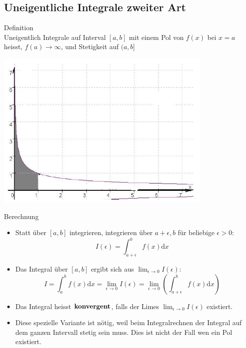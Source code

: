 \subsection{Uneigentliche Integrale zweiter Art}
	\begin{definition}{Definition}\\
		Uneigentlich Integrale auf Interval \([a,b]\) mit einem Pol von \(f(x)\) bei \(x=a\) heisst,
		\(f(a) \rightarrow \infty\), und Stetigkeit auf \((a,b]\)
	  \begin{centering}
	  \includegraphics[width=0.8\textwidth]{images/Uneigentlicher_Integral_Beispiel2.png}\\
	  \end{centering}
  \end{definition}
  \begin{KR}{Berechnung}\\
	  \begin{itemize}
	  	
\item Statt über \([a,b]\) integrieren, integrieren über \(a+\epsilon,b\) für beliebige \(\epsilon>0\):
	\[I(\epsilon)=\int_{a+\epsilon}^b{f(x)\mathrm{d}x}\]
\item Das Integral über \([a,b]\) ergibt sich aus \(\lim_{\epsilon \rightarrow 0}I(\epsilon)\):
	\[I=\int_a^b{f(x)\mathrm{d}x}=\underset{\epsilon \rightarrow 0}{\lim}I(\epsilon)=\underset{\epsilon \rightarrow
	0}{\lim}\left(\int_{a+\epsilon}^b{f(x)\mathrm{d}x}\right) \]
\item Das Integral heisst \(\bold{konvergent}\), falls der Limes \(\lim_{\epsilon \rightarrow 0}I(\epsilon)\) existiert.
\item Diese spezielle Variante ist nötig, weil beim Integralrechnen der Integral auf dem ganzen Intervall stetig sein
	muss. Dies ist nicht der Fall wen ein Pol existiert.
\end{itemize}
  \end{KR}
